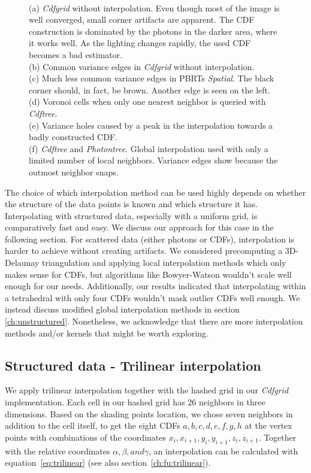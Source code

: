 \begin{figure}
{    \\(a) \textit{Cdfgrid} without interpolation. Even though most of the image is well converged, small corner artifacts are apparent. The CDF construction is dominated by the photons in the darker area, where it works well. As the lighting changes rapidly, the used CDF becomes a bad estimator. 
    \\(b) Common variance edges in \textit{Cdfgrid} without interpolation. 
    \\(c) Much less common variance edges in PBRTs \textit{Spatial}. The black corner should, in fact, be brown. Another edge is seen on the left. 
    \\(d) Voronoi cells when only one nearest neighbor is queried with \textit{Cdftree}. 
    \\(e) Variance holes caused by a peak in the interpolation towards a badly constructed CDF.
    \\(f) \textit{Cdftree} and \textit{Photontree}. Global interpolation used with only a limited number of local neighbors. Variance edges show because the outmost neighbor snaps.
    }
\end{figure}


The choice of which interpolation method can be used highly depends on whether the structure of the data points is known and which structure it has. Interpolating with structured data, especially with a uniform grid, is comparatively fast and easy. We discuss our approach for this case in the following section. For scattered data (either photons or CDFs), interpolation is harder to achieve without creating artifacts. We considered precomputing a 3D-Delaunay triangulation and applying local interpolation methods which only makes sense for CDFs, but algorithms like Bowyer-Watson wouldn't scale well enough for our needs. Additionally, our results indicated that interpolating within a tetrahedral with only four CDFs wouldn't mask outlier CDFs well enough. We instead discuss modified global interpolation methods in section \ref{ch:unstructured}. Nonetheless, we acknowledge that there are more interpolation methods and/or kernels that might be worth exploring.

\subsection{Structured data - Trilinear interpolation}
\label{ch:trilinear}

We apply trilinear interpolation together with the hashed grid in our \textit{Cdfgrid} implementation. Each cell in our hashed grid has 26 neighbors in three dimensions. Based on the shading points location, we chose seven neighbors in addition to the cell itself, to get the eight CDFs $a,b,c,d,e,f,g,h$ at the vertex points with combinations of the coordinates $x_i, x_{i+1}, y_i, y_{i+1}, z_i, z_{i+1}$. Together with the relative coordinates $\alpha, \beta, and \gamma$, an interpolation can be calculated with equation~\ref{eq:trilinear} (see also section~\ref{ch:fu:trilinear}).

